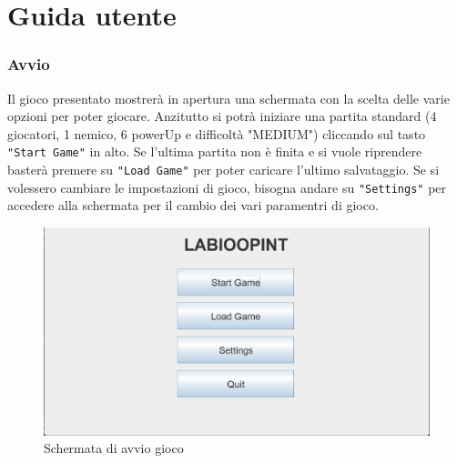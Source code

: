 \documentclass[a4paper,12pt]{report}
\begin{document}
\chapter{Guida utente}

\subsection*{Avvio}
Il gioco presentato mostrerà in apertura una schermata con la scelta delle varie opzioni per poter giocare. Anzitutto si potrà iniziare 
una partita standard (4 giocatori, 1 nemico, 6 powerUp e difficoltà "MEDIUM") cliccando sul tasto \texttt{"Start Game"} in alto. Se l'ultima partita non è finita e si vuole riprendere basterà premere su 
\texttt{"Load Game"} per poter caricare l'ultimo salvataggio. Se si volessero cambiare le impostazioni di gioco, bisogna andare su \texttt{"Settings"} per accedere alla 
schermata per il cambio dei vari paramentri di gioco. 
\begin{figure}[H]
	\centering
	\includegraphics[width=\textwidth]{img/HomePage.png}
	\caption{Schermata di avvio gioco}
	\label{img:HomePage}
\end{figure}
\end{document}
